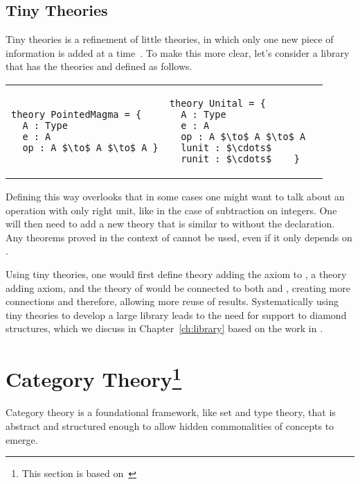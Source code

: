 \subsection{Tiny Theories}
\label{sec:background:tinytheories}
Tiny theories is a refinement of little theories, in which only one new piece of information is added at a time~\cite{mathscheme2011experiments}. To make this more clear, let's consider a library that has the theories  and  defined as follows. \\
\begin{tabular}{p{7cm} p{7cm}}
\begin{lstlisting}[mathescape]
theory PointedMagma = { 
  A : Type 
  e : A 
  op : A $\to$ A $\to$ A }
\end{lstlisting}
&
\begin{lstlisting}[mathescape]
theory Unital = {
  A : Type 
  e : A 
  op : A $\to$ A $\to$ A 
  lunit : $\cdots$
  runit : $\cdots$    }   
\end{lstlisting}
\end{tabular}

Defining  this way overlooks that in some cases one might want to talk about an operation with only right unit, like in the case of subtraction on integers. One will then need to add a new theory that is similar to  without the  declaration. Any theorems proved in the context of  cannot be used, even if it only depends on . 

Using tiny theories, one would first define  theory adding the  axiom to , a  theory adding  axiom, and the theory of  would be connected to both  and , creating more connections and therefore, allowing more reuse of results. Systematically using tiny theories to develop a large library leads to the need for support to diamond structures, which we discuss in Chapter~\ref{ch:library} based on the work in \cite{carette2018building}.  

\section[title]{Category Theory\footnote{This section is based on~\cite{pierce1990taste}}}
\label{sec:categoryTh}
Category theory is a foundational framework, like set and type theory, that is abstract and structured enough to allow hidden commonalities of concepts to emerge. 

